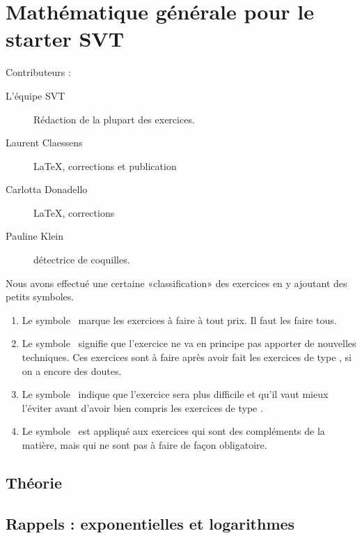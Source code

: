 \chapter{Mathématique générale pour le starter SVT}

Contributeurs :
\begin{description}
    \item[L'équipe SVT] Rédaction de la plupart des exercices.
    \item[Laurent Claessens] \LaTeX, corrections et publication
    \item[Carlotta Donadello] \LaTeX, corrections
    \item[Pauline Klein] détectrice de coquilles.
\end{description}

Nous avons effectué une certaine «classification» des exercices en y ajoutant des petits symboles.
\begin{enumerate}
	\item Le symbole \minsyndical\ marque les exercices à faire à tout prix. Il faut les faire tous.
	\item Le symbole \boringexo\ signifie que l'exercice ne va en principe pas apporter de nouvelles techniques. Ces exercices sont à faire après avoir fait les exercices de type \minsyndical, si on a encore des doutes.
	\item Le symbole \coolexo\ indique que l'exercice sera plus difficile et qu'il vaut mieux l'éviter avant d'avoir bien compris les exercices de type \minsyndical.
	\item Le symbole \mortelexo\ est appliqué aux exercices qui sont des compléments de la matière, mais qui ne sont pas à faire de façon obligatoire.
\end{enumerate}

\section{Théorie}


\section{Rappels : exponentielles et logarithmes}


